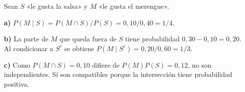 Sean $S$ «le gusta la salsa» y $M$ «le gusta el merengue».

\textbf{a)} $P(M\mid S)=P(M\cap S)/P(S)=0{,}10/0{,}40=\boxed{1/4}$.

\textbf{b)} La parte de $M$ que queda fuera de $S$ tiene probabilidad $0{,}30-0{,}10=0{,}20$. Al condicionar a $S^c$ se obtiene $P(M\mid S^c)=0{,}20/0{,}60=\boxed{1/3}$.

\textbf{c)} Como $P(M\cap S)=0{,}10$ difiere de $P(M)P(S)=0{,}12$, no son independientes. Sí son compatibles porque la intersección tiene probabilidad positiva.
